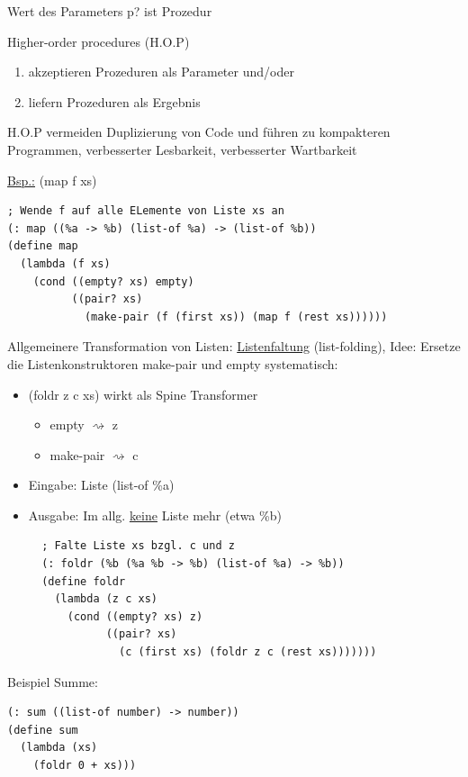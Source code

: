 \documentclass[a4paper, 20pt, openany]{book}
\begin{document}
Wert des Parameters p? ist Prozedur

Higher-order procedures (H.O.P) 

\begin{enumerate}[label=(\alph*)]
  \item akzeptieren Prozeduren als Parameter und/oder
  \item liefern Prozeduren als Ergebnis
\end{enumerate}

H.O.P vermeiden Duplizierung von Code und führen zu kompakteren Programmen, verbesserter Lesbarkeit, verbesserter Wartbarkeit

\underline{Bsp.:} (map f xs)

\begin{lstlisting}
; Wende f auf alle ELemente von Liste xs an
(: map ((%a -> %b) (list-of %a) -> (list-of %b))
(define map
  (lambda (f xs)
    (cond ((empty? xs) empty)
          ((pair? xs)
            (make-pair (f (first xs)) (map f (rest xs))))))
\end{lstlisting}

Allgemeinere Transformation von Listen: \underline{Listenfaltung} (list-folding), Idee: Ersetze die Listenkonstruktoren make-pair und empty systematisch:

\begin{itemize}
  \item (foldr z c xs) wirkt als Spine Transformer
    \begin{itemize}
      \item empty $\rightsquigarrow$ z
      \item make-pair $\rightsquigarrow$ c
    \end{itemize}
    
  \item Eingabe: Liste (list-of \%a)
  \item Ausgabe: Im allg. \underline{keine} Liste mehr (etwa \%b)
  
  \begin{lstlisting}
  ; Falte Liste xs bzgl. c und z
  (: foldr (%b (%a %b -> %b) (list-of %a) -> %b))
  (define foldr
    (lambda (z c xs)
      (cond ((empty? xs) z)
            ((pair? xs) 
              (c (first xs) (foldr z c (rest xs)))))))
   \end{lstlisting}
\end{itemize}

Beispiel Summe:

\begin{lstlisting}
(: sum ((list-of number) -> number))
(define sum
  (lambda (xs)
    (foldr 0 + xs)))
\end{lstlisting}
\end{document}
